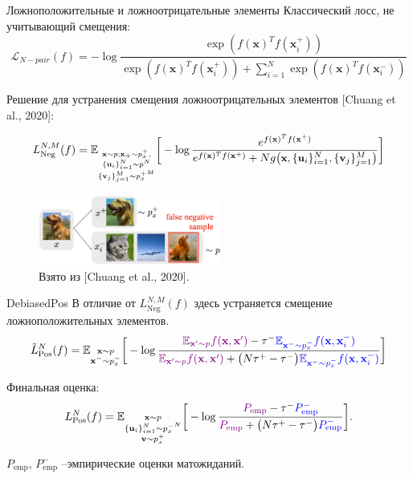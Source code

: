 \documentclass{beamer}
\begin{document}
\begin{frame}{Ложноположительные и ложноотрицательные элементы}
Классический лосс, не учитывающий смещения:
\[\mathcal{L}_{N-pair}(f) = - \log \frac{\exp(f(\textbf{x})^T f(\textbf{x}_i^+))}{\exp(f(\textbf{x})^T f(\textbf{x}_i^+)) + \sum _{i=1}^{N} \exp(f(\textbf{x})^Tf(\textbf{x}_i^-))}\]

Решение для устранения смещения ложноотрицательных элементов [Chuang et al., 2020]:

\begin{equation*} \small
L_{\text{Neg}}^{N, M}(f) = \mathbb{E}_{\substack{\textbf{x} \sim p; \textbf{x}_+ \sim p_x^+,\\ \{\textbf{u}_i\}_{i=1}^N \sim p^N \\ \{\textbf{v}_j\}_{j=1}^M \sim {p_x^+}^M}}  \bigg[ -\log \frac{e^{f(\textbf{x})^T f(\textbf{x}^+)} }{e^{f(\textbf{x})^T f(\textbf{x}^+)} + N g\big(\textbf{x}, \{\textbf{u}_i\}_{i=1}^N, \{\textbf{v}_j\}_{j=1}^M\big)} \bigg]
\end{equation*}

\begin{figure}
\includegraphics[width=6cm]{Presentation/contrastive-sampling-bias.png}
\caption{Взято из [Chuang et al., 2020].}
\end{figure}
\end{frame}
\begin{frame}{DebiasedPos}
\scriptsize
В отличие от $L_{\text{Neg}}^{N, M}(f)$ здесь устраняется смещение ложноположительных элементов.
\begin{equation*}
\tilde{L}_{\text{Pos}}^N (f) = \mathbb{E}_{\substack{\textbf{x} \sim p \\ \textbf{x}^- \sim p_x^-}} \bigg[ - \log \frac{\color{violet} \mathbb{E}_{\textbf{x}' \sim p} f(\textbf{x}, \textbf{x}') \color{black} - \tau^- \color{blue} \mathbb{E}_{\textbf{x}^- \sim p_x^-} f(\textbf{x}, \textbf{x}_i^-)}{\color{violet} \mathbb{E}_{\textbf{x}' \sim p} f(\textbf{x}, \textbf{x}') \color{black} + \big(N \tau^+ - \tau^-\big) \color{blue} \mathbb{E}_{\textbf{x}^- \sim p_x^-} f(\textbf{x}, \textbf{x}_i^-)}\bigg]
\end{equation*}

Финальная оценка:
\begin{equation*}
L_{\text{Pos}}^N (f) = \mathbb{E}_{\substack{\textbf{x} \sim p \\ \{\textbf{u}_i\}_{i=1}^N \sim {p_x^-}^N \\ \textbf{v} \sim p_x^+}} \bigg[-\log \frac{\color{violet}P_{\text{emp}} \color{black} - \tau^- \color{blue} P_{\text{emp}}^-} {\color{violet}P_{\text{emp}} \color{black} + \big(N \tau^+ - \tau^-\big) \color{blue} P_{\text{emp}}^- }\bigg].
\end{equation*}

$P_{\text{emp}}$, $P_{\text{emp}}^-$ --эмпирические оценки матожиданий.
\end{frame}
\end{document}
